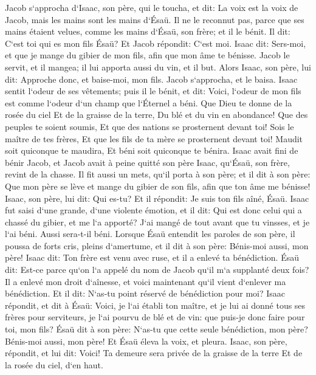 \verse Jacob s`approcha d`Isaac, son père, qui le toucha, et dit: La voix est la voix de Jacob, mais les mains sont les mains d`Ésaü. 
\verse Il ne le reconnut pas, parce que ses mains étaient velues, comme les mains d`Ésaü, son frère; et il le bénit. 
\verse Il dit: C`est toi qui es mon fils Ésaü? Et Jacob répondit: C`est moi. 
\verse Isaac dit: Sers-moi, et que je mange du gibier de mon fils, afin que mon âme te bénisse. Jacob le servit, et il mangea; il lui apporta aussi du vin, et il but. 
\verse Alors Isaac, son père, lui dit: Approche donc, et baise-moi, mon fils. 
\verse Jacob s`approcha, et le baisa. Isaac sentit l`odeur de ses vêtements; puis il le bénit, et dit: Voici, l`odeur de mon fils est comme l`odeur d`un champ que l`Éternel a béni. 
\verse Que Dieu te donne de la rosée du ciel Et de la graisse de la terre, Du blé et du vin en abondance! 
\verse Que des peuples te soient soumis, Et que des nations se prosternent devant toi! Sois le maître de tes frères, Et que les fils de ta mère se prosternent devant toi! Maudit soit quiconque te maudira, Et béni soit quiconque te bénira. 
\verse Isaac avait fini de bénir Jacob, et Jacob avait à peine quitté son père Isaac, qu`Ésaü, son frère, revint de la chasse. 
\verse Il fit aussi un mets, qu`il porta à son père; et il dit à son père: Que mon père se lève et mange du gibier de son fils, afin que ton âme me bénisse! 
\verse Isaac, son père, lui dit: Qui es-tu? Et il répondit: Je suis ton fils aîné, Ésaü. 
\verse Isaac fut saisi d`une grande, d`une violente émotion, et il dit: Qui est donc celui qui a chassé du gibier, et me l`a apporté? J`ai mangé de tout avant que tu vinsses, et je l`ai béni. Aussi sera-t-il béni. 
\verse Lorsque Ésaü entendit les paroles de son père, il poussa de forts cris, pleins d`amertume, et il dit à son père: Bénis-moi aussi, mon père! 
\verse Isaac dit: Ton frère est venu avec ruse, et il a enlevé ta bénédiction. 
\verse Ésaü dit: Est-ce parce qu`on l`a appelé du nom de Jacob qu`il m`a supplanté deux fois? Il a enlevé mon droit d`aînesse, et voici maintenant qu`il vient d`enlever ma bénédiction. Et il dit: N`as-tu point réservé de bénédiction pour moi? 
\verse Isaac répondit, et dit à Ésaü: Voici, je l`ai établi ton maître, et je lui ai donné tous ses frères pour serviteurs, je l`ai pourvu de blé et de vin: que puis-je donc faire pour toi, mon fils? 
\verse Ésaü dit à son père: N`as-tu que cette seule bénédiction, mon père? Bénis-moi aussi, mon père! Et Ésaü éleva la voix, et pleura. 
\verse Isaac, son père, répondit, et lui dit: Voici! Ta demeure sera privée de la graisse de la terre Et de la rosée du ciel, d`en haut. 
